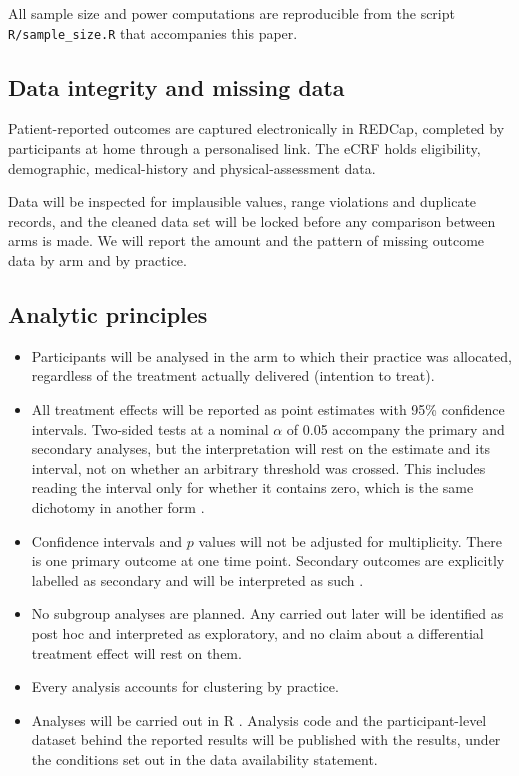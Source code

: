 \documentclass[11pt,a4paper]{article}
\begin{document}
All sample size and power computations are reproducible from the script
\texttt{R/sample\_size.R} that accompanies this paper.

\subsection{Data integrity and missing data}

Patient-reported outcomes are captured electronically in REDCap, completed by
participants at home through a personalised link. The eCRF holds eligibility,
demographic, medical-history and physical-assessment data.

Data will be inspected for implausible values, range violations and duplicate
records, and the cleaned data set will be locked before any comparison
between arms is made. We will report the amount and the
pattern of missing outcome data by arm and by practice.

\subsection{Analytic principles}
\label{sec:principles}

\begin{itemize}[leftmargin=1.4em, itemsep=2pt]
\item Participants will be analysed in the arm to which their practice was
allocated, regardless of the treatment actually delivered (intention to treat).
\item All treatment effects will be reported as point estimates with 95\%
confidence intervals. Two-sided tests at a nominal $\alpha$ of 0.05 accompany
the primary and secondary analyses, but the interpretation will rest on the
estimate and its interval, not on whether an arbitrary threshold was crossed.
This includes reading the interval only for whether it contains zero, which
is the same dichotomy in another form \citep{wasserstein2019, amrhein2019}.
\item Confidence intervals and $p$ values will not be adjusted for
multiplicity. There is one primary outcome at one time point. Secondary
outcomes are explicitly labelled as secondary and will be interpreted as such
\citep{gamble2017}.
\item No subgroup analyses are planned. Any carried out later will be
identified as post hoc and interpreted as exploratory, and no claim about a
differential treatment effect will rest on them.
\item Every analysis accounts for clustering by practice.
\item Analyses will be carried out in R \citep{rcore}. Analysis code and the
participant-level dataset behind the reported results will be published with
the results, under the conditions set out in the data availability statement.
\end{itemize}
\end{document}
